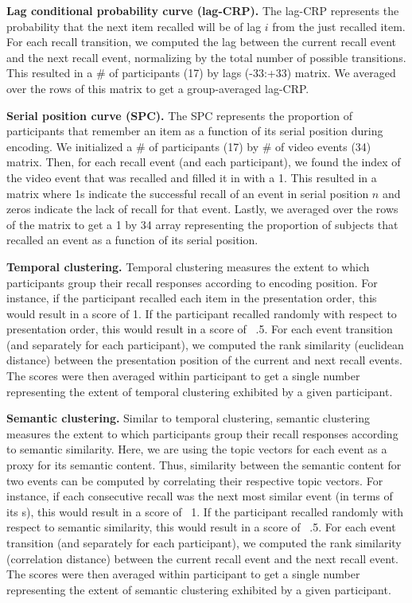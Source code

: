 \documentclass{article}
\begin{document}
{\textbf{Lag conditional probability curve (lag-CRP).} The lag-CRP represents the probability that the next item recalled will be of lag $i$ from the just recalled item. For each recall transition, we computed the lag between the current recall event and the next recall event, normalizing by the total number of possible transitions.  This resulted in a \# of participants (17) by lags (-33:+33) matrix. We averaged over the rows of this matrix to get a group-averaged lag-CRP.

\textbf{Serial position curve (SPC).} The SPC represents the proportion of participants that remember an item as a function of its serial position during encoding. We initialized a \# of participants (17) by \# of video events (34) matrix. Then, for each recall event (and each participant), we found the index of the video event that was recalled and filled it in with a 1. This resulted in a matrix where 1s indicate the successful recall of an event in serial position $n$ and zeros indicate the lack of recall for that event.  Lastly, we averaged over the rows of the matrix to get a 1 by 34 array representing the proportion of subjects that recalled an event as a function of its serial position.

\textbf{Temporal clustering.} Temporal clustering measures the extent to which participants group their recall responses according to encoding position. For instance, if the participant recalled each item in the presentation order, this would result in a score of 1. If the participant recalled randomly with respect to presentation order, this would result in a score of ~.5.  For each event transition (and separately for each participant), we computed the rank similarity (euclidean distance) between the presentation position  of the current and next recall events. The scores were then averaged within participant to get a single number representing the extent of temporal clustering exhibited by a given participant.

\textbf{Semantic clustering.} Similar to temporal clustering, semantic clustering measures the extent to which participants group their recall responses according to semantic similarity. Here, we are using the topic vectors for each event as a proxy for its semantic content. Thus, similarity between the semantic content for two events can be computed by correlating their respective topic vectors.  For instance, if each consecutive recall was the next most similar event (in terms of its s), this would result in a score of ~1. If the participant recalled randomly with respect to semantic similarity, this would result in a score of ~.5.  For each event transition (and separately for each participant), we computed the rank similarity (correlation distance) between the current recall event and the next recall event. The scores were then averaged within participant to get a single number representing the extent of semantic clustering exhibited by a given participant.

}
\end{document}
